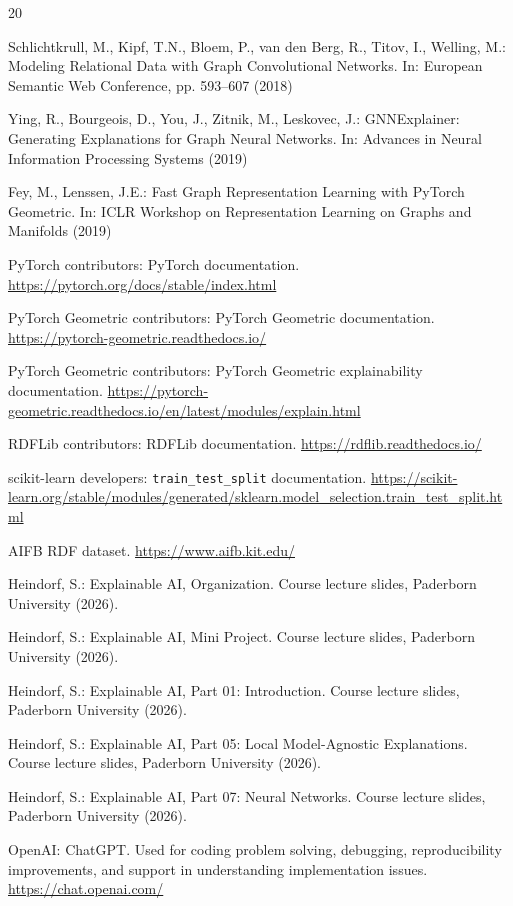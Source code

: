 \documentclass[runningheads]{llncs}
\begin{document}
\begin{thebibliography}{20}

Schlichtkrull, M., Kipf, T.N., Bloem, P., van den Berg, R., Titov, I., Welling, M.:
Modeling Relational Data with Graph Convolutional Networks.
In: European Semantic Web Conference, pp. 593--607 (2018)

Ying, R., Bourgeois, D., You, J., Zitnik, M., Leskovec, J.:
GNNExplainer: Generating Explanations for Graph Neural Networks.
In: Advances in Neural Information Processing Systems (2019)

Fey, M., Lenssen, J.E.:
Fast Graph Representation Learning with PyTorch Geometric.
In: ICLR Workshop on Representation Learning on Graphs and Manifolds (2019)

PyTorch contributors:
PyTorch documentation.
\url{https://pytorch.org/docs/stable/index.html}

PyTorch Geometric contributors:
PyTorch Geometric documentation.
\url{https://pytorch-geometric.readthedocs.io/}

PyTorch Geometric contributors:
PyTorch Geometric explainability documentation.
\url{https://pytorch-geometric.readthedocs.io/en/latest/modules/explain.html}

RDFLib contributors:
RDFLib documentation.
\url{https://rdflib.readthedocs.io/}

scikit-learn developers:
\texttt{train\_test\_split} documentation.
\url{https://scikit-learn.org/stable/modules/generated/sklearn.model_selection.train_test_split.html}

AIFB RDF dataset.
\url{https://www.aifb.kit.edu/}

Heindorf, S.:
Explainable AI, Organization.
Course lecture slides, Paderborn University (2026).

Heindorf, S.:
Explainable AI, Mini Project.
Course lecture slides, Paderborn University (2026).

Heindorf, S.:
Explainable AI, Part 01: Introduction.
Course lecture slides, Paderborn University (2026).

Heindorf, S.:
Explainable AI, Part 05: Local Model-Agnostic Explanations.
Course lecture slides, Paderborn University (2026).

Heindorf, S.:
Explainable AI, Part 07: Neural Networks.
Course lecture slides, Paderborn University (2026).

OpenAI:
ChatGPT.
Used for coding problem solving, debugging, reproducibility improvements, and support in understanding implementation issues.
\url{https://chat.openai.com/}

\end{thebibliography}
\end{document}
